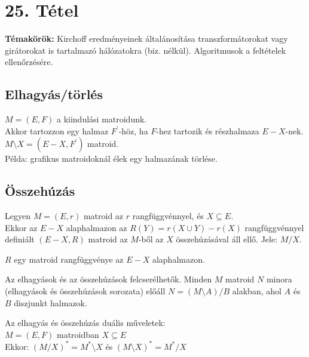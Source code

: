 
\setcounter{chapter}{25}
\chapter*{25. Tétel}

\textbf{Témakörök:} Kirchoff eredményeinek általánosítása transzformátorokat vagy girátorokat is tartalmazó hálózatokra (biz. nélkül). Algoritmusok a feltételek ellenőrzésére.

\noindent\hrulefill

\section*{Elhagyás/törlés}
$M=(E,F)$ a kiindulási matroidunk.\\
Akkor tartozzon egy halmaz $F^{'}$-höz, ha $F$-hez tartozik és részhalmaza $E-X$-nek.\\
$M\setminus X=(E-X,F^{'})$ matroid.\\
Példa: grafikus matroidoknál élek egy halmazának törlése.

\section*{Összehúzás}
Legyen $M=(E,r)$ matroid az $r$ rangfüggvénnyel, és $X\subseteq E$.\\
Ekkor az $E-X$ alaphalmazon az $R(Y)=r(X\cup Y)-r(X)$ rangfüggvénnyel definiált $(E-X,R)$ matroid az $M$-ből az $X$ összehúzásával áll ellő. Jele: $M/X$.

\begin{lem}
$R$ egy matroid rangfüggvénye az $E-X$ alaphalmazon.
\end{lem}

\begin{theo}
Az elhagyások és az összehúzások felcserélhetők. Minden $M$ matroid $N$ minora (elhagyások és összehúzások sorozata) előáll $N=(M\setminus A)/B$ alakban, ahol $A$ és $B$ diszjunkt halmazok.
\end{theo}

\begin{theo}
Az elhagyás és összehúzás duális műveletek:\\
$M=(E,F)$ matroidban $X\subseteq E$\\
Ekkor: $(M/X)^{*}=M^{*}\setminus X$ és $(M\setminus X)^{*}=M^{*}/X$
\end{theo}

